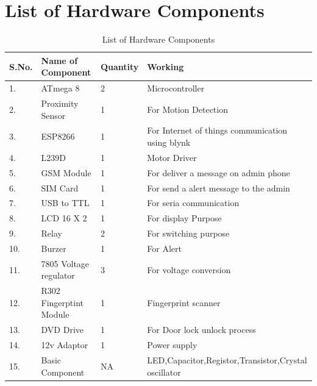 \documentclass[twoside,a4paper,16pt]{book}
\begin{document}
{{			\section{List of Hardware Components}
			\begin{center}
				\begin{table}[h!]
					\centering
					\begin{tabular}{|p{1cm}|p{8cm}|p{1cm}|p{6.5cm}|}
						\hline
						{\bf S.No.} & {\bf Name of Component} & {Quantity} & {\bf Working}\\
						\hline	
						1. & ATmega 8 & 2 & Microcontroller\\
						\hline
						2. & Proximity Sensor  & 1 & For Motion Detection\\
						\hline
						3. & ESP8266 & 1 & For Internet of things communication using blynk\\
						\hline
						4. & L239D & 1 & Motor Driver\\
						\hline
						5. & GSM Module & 1 & For deliver a message on admin phone\\
						\hline
						6. & SIM Card & 1 & For send a alert message to the admin\\
						\hline
						7. & USB to TTL & 1 & For seria communication\\
						\hline
						8. & LCD 16 X 2 & 1 & For display Purpose \\
						\hline
						9. & Relay & 2 & For switching purpose \\
						\hline
						10. & Burzer & 1 & For Alert \\
						\hline
						11. & 7805 Voltage regulator & 3 & For voltage conversion \\
						\hline
						12. & R302 Fingerptint Module & 1 & Fingerprint scanner \\
						\hline
						13. & DVD Drive & 1 & For Door lock unlock process\\
						\hline
						14. & 12v Adaptor & 1 & Power supply \\
						\hline
						15. & Basic Component & NA & LED,Capacitor,Registor,Transistor,Crystal oscillator \\
						\hline
					\end{tabular}
					\caption{List of Hardware Components}	
				\end{table}
			\end{center}
}}
\end{document}
